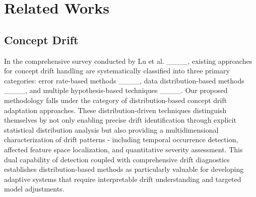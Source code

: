 \section{Related Works}
\label{appendix:relatedwork}

\subsection{Concept Drift}

In the comprehensive survey conducted by Lu et al. ____, existing approaches for concept drift handling are systematically classified into three primary categories: error rate-based methods ____, data distribution-based methods ____, and multiple hypothesis-based techniques ____. Our proposed methodology falls under the category of distribution-based concept drift adaptation approaches. These distribution-driven techniques distinguish themselves by not only enabling precise drift identification through explicit statistical distribution analysis but also providing a multidimensional characterization of drift patterns - including temporal occurrence detection, affected feature space localization, and quantitative severity assessment. This dual capability of detection coupled with comprehensive drift diagnostics establishes distribution-based methods as particularly valuable for developing adaptive systems that require interpretable drift understanding and targeted model adjustments.


